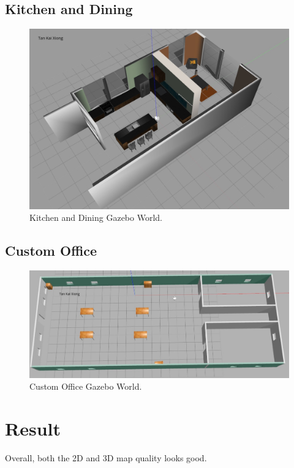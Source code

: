 \documentclass[10pt,journal,compsoc]{IEEEtran}
\begin{document}
\subsection{Kitchen and Dining}

\begin{figure}[thpb]
      \centering
      \includegraphics[width=\linewidth]{kitchen_gazebo.png}
      \caption{Kitchen and Dining Gazebo World.}
      \label{fig:robot2}
\end{figure}

\subsection{Custom Office}

\begin{figure}[thpb]
      \centering
      \includegraphics[width=\linewidth]{custom_office_world.png}
      \caption{Custom Office Gazebo World.}
      \label{fig:robot3}
\end{figure}

\section{Result}
Overall, both the 2D and 3D map quality looks good. 
\end{document}

